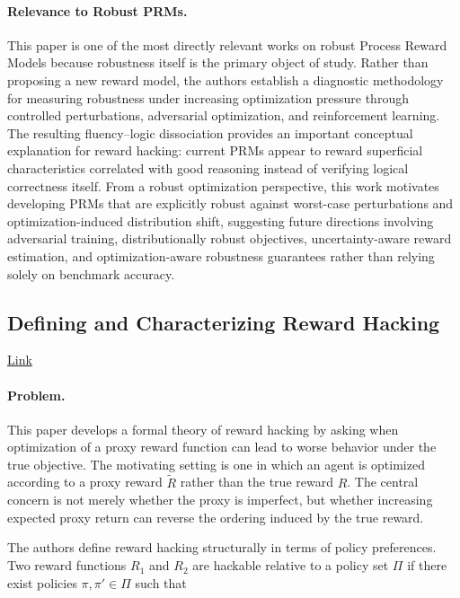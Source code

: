 \documentclass[11pt]{article}
\begin{document}
\paragraph{Relevance to Robust PRMs.}
This paper is one of the most directly relevant works on robust Process Reward Models because robustness itself is the primary object of study. Rather than proposing a new reward model, the authors establish a diagnostic methodology for measuring robustness under increasing optimization pressure through controlled perturbations, adversarial optimization, and reinforcement learning. The resulting fluency--logic dissociation provides an important conceptual explanation for reward hacking: current PRMs appear to reward superficial characteristics correlated with good reasoning instead of verifying logical correctness itself. From a robust optimization perspective, this work motivates developing PRMs that are explicitly robust against worst-case perturbations and optimization-induced distribution shift, suggesting future directions involving adversarial training, distributionally robust objectives, uncertainty-aware reward estimation, and optimization-aware robustness guarantees rather than relying solely on benchmark accuracy.

\subsection{Defining and Characterizing Reward Hacking}

\href{https://arxiv.org/pdf/2209.13085}{Link}

\paragraph{Problem.}

This paper develops a formal theory of reward hacking by asking when optimization of a proxy reward function can lead to worse behavior under the true objective. The motivating setting is one in which an agent is optimized according to a proxy reward $\tilde{R}$ rather than the true reward $R$. The central concern is not merely whether the proxy is imperfect, but whether increasing expected proxy return can reverse the ordering induced by the true reward.

The authors define reward hacking structurally in terms of policy preferences. Two reward functions $R_1$ and $R_2$ are hackable relative to a policy set $\Pi$ if there exist policies $\pi,\pi' \in \Pi$ such that
\end{document}
